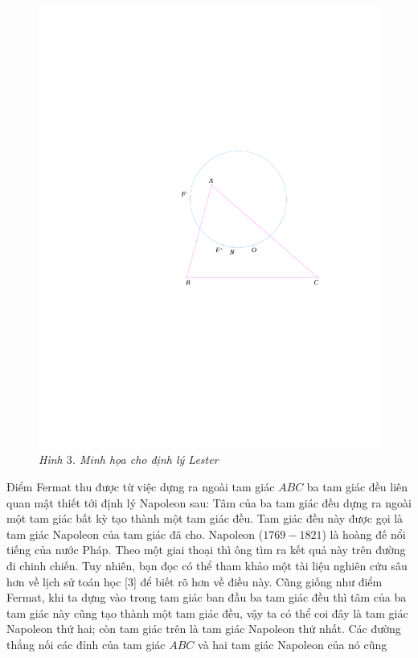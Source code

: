 \begin{multicols}{2}
	\begin{figure}[H]
		\vspace*{-5pt}
		\centering
		\captionsetup{labelformat= empty, justification=centering}
		\includegraphics[width= 0.85\linewidth]{figure8055}
		\caption{\small\textit{\color{cackithi}Hình $3$. Minh họa cho định lý Lester}}
		\vspace*{-10pt}
	\end{figure}
	Điểm Fermat thu được từ việc dựng ra ngoài tam giác $ABC$ ba tam giác đều liên quan mật thiết tới định lý Napoleon sau:
	\vskip 0.1cm
	 Tâm của ba tam giác đều dựng ra ngoài một tam giác bất kỳ tạo thành một tam giác đều. Tam giác đều này được gọi là tam giác Napoleon của tam giác đã cho.
	\vskip 0.1cm
	Napoleon ($1769-1821$) là hoàng đế nổi tiếng của nước Pháp. Theo một giai thoại thì ông tìm ra kết quả này trên đường đi chinh chiến. Tuy nhiên, bạn đọc có thể tham khảo một tài liệu nghiên cứu sâu hơn về lịch sử toán học [$3$] để biết rõ hơn về điều này.
	\vskip 0.1cm
	Cũng giống như điểm Fermat, khi ta dựng vào trong tam giác ban đầu ba tam giác đều thì tâm của ba tam giác này cũng tạo thành một tam giác đều, vậy ta có thể coi đây là tam giác Napoleon thứ hai; còn tam giác trên là tam giác Napoleon thứ nhất. Các đường thẳng nối các đỉnh của tam giác $ABC$ và hai tam giác Napoleon của nó cũng 

\end{multicols}

